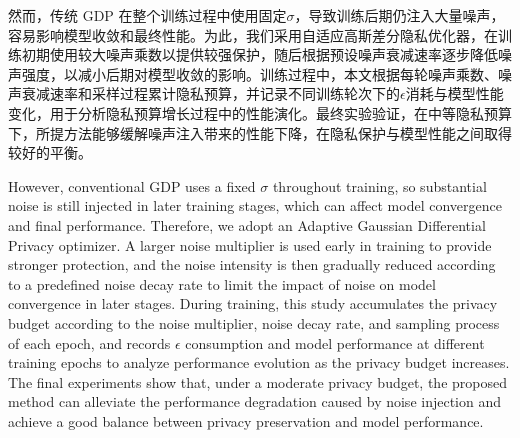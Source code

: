 然而，传统 GDP 在整个训练过程中使用固定\(\sigma\)，导致训练后期仍注入大量噪声，容易影响模型收敛和最终性能。为此，我们采用自适应高斯差分隐私优化器，在训练初期使用较大噪声乘数以提供较强保护，随后根据预设噪声衰减速率逐步降低噪声强度，以减小后期对模型收敛的影响。训练过程中，本文根据每轮噪声乘数、噪声衰减速率和采样过程累计隐私预算，并记录不同训练轮次下的\(\epsilon\)消耗与模型性能变化，用于分析隐私预算增长过程中的性能演化。最终实验验证，在中等隐私预算下，所提方法能够缓解噪声注入带来的性能下降，在隐私保护与模型性能之间取得较好的平衡。

However, conventional GDP uses a fixed \(\sigma\) throughout training, so substantial noise is still injected in later training stages, which can affect model convergence and final performance. Therefore, we adopt an Adaptive Gaussian Differential Privacy optimizer. A larger noise multiplier is used early in training to provide stronger protection, and the noise intensity is then gradually reduced according to a predefined noise decay rate to limit the impact of noise on model convergence in later stages. During training, this study accumulates the privacy budget according to the noise multiplier, noise decay rate, and sampling process of each epoch, and records \(\epsilon\) consumption and model performance at different training epochs to analyze performance evolution as the privacy budget increases. The final experiments show that, under a moderate privacy budget, the proposed method can alleviate the performance degradation caused by noise injection and achieve a good balance between privacy preservation and model performance.
